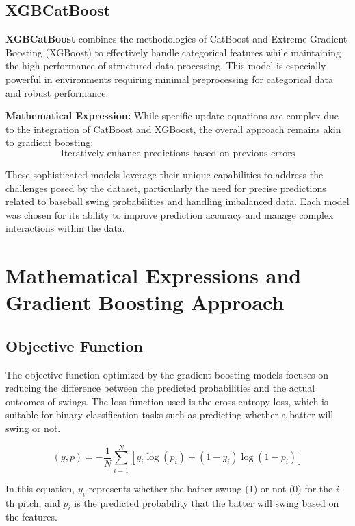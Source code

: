 \documentclass[12pt]{article}
\begin{document}
\subsection{XGBCatBoost}
\textbf{XGBCatBoost} combines the methodologies of CatBoost and Extreme Gradient Boosting (XGBoost) to effectively handle categorical features while maintaining the high performance of structured data processing. This model is especially powerful in environments requiring minimal preprocessing for categorical data and robust performance.

\textbf{Mathematical Expression:}
While specific update equations are complex due to the integration of CatBoost and XGBoost, the overall approach remains akin to gradient boosting:
\[
\text{Iteratively enhance predictions based on previous errors}
\]

These sophisticated models leverage their unique capabilities to address the challenges posed by the dataset, particularly the need for precise predictions related to baseball swing probabilities and handling imbalanced data. Each model was chosen for its ability to improve prediction accuracy and manage complex interactions within the data.


\maketitle

\section{Mathematical Expressions and Gradient Boosting Approach}

\subsection*{Objective Function}
The objective function optimized by the gradient boosting models focuses on reducing the difference between the predicted probabilities and the actual outcomes of swings. The loss function used is the cross-entropy loss, which is suitable for binary classification tasks such as predicting whether a batter will swing or not.

\[
(y,p) = -\frac{1}{N} \sum_{i=1}^N \left[ y_i \log(p_i) + (1-y_i) \log(1-p_i) \right]
\]

In this equation, \(y_i\) represents whether the batter swung (1) or not (0) for the \(i\)-th pitch, and \(p_i\) is the predicted probability that the batter will swing based on the features.
\end{document}
